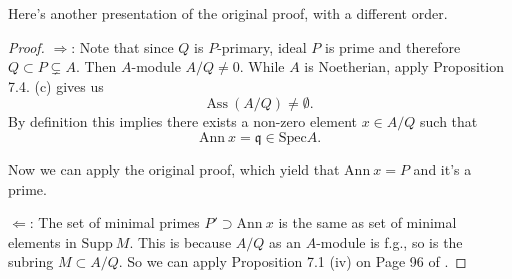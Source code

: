 Here's another presentation of the original proof, with a different order.

\begin{proof}
$\Rightarrow$: Note that since $Q$ is $P$-primary, ideal $P$ is prime and therefore $Q\subset P\subsetneq A$. Then $A$-module $A/Q\neq 0$. While $A$ is Noetherian, apply Proposition 7.4. (c) gives us \[\text{Ass}~(A/Q)\neq \emptyset.\] 
By definition this implies there exists a non-zero element $x\in A/Q$ such that 
\[\text{Ann}~ x =\mathfrak q\in\text{Spec}A.\]

Now we can apply the original proof, which yield that $\text{Ann}~ x=P$ and it's a prime. 

$\Leftarrow$: The set of minimal primes $P'\supset \text{Ann}~ x$ is the same as set of minimal elements in $\text{Supp}~ M$. This is because $A/Q$ as an $A$-module is f.g., so is the subring $M\subset A/Q$. So we can apply Proposition 7.1 (iv) on Page 96 of \cite{reid1995undergraduate}.

\end{proof}